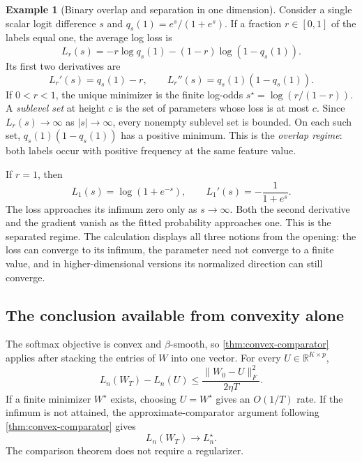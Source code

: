 \documentclass[11pt,twoside]{article}
\newcommand{\R}{\mathbb R}
\theoremstyle{definition}
\newtheorem{example}[theorem]{Example}
\theoremstyle{remark}
\begin{document}
\begin{example}[Binary overlap and separation in one dimension]
\label{ex:binary-softmax-regimes}
Consider a single scalar logit difference $s$ and
$q_s(1)=e^s/(1+e^s)$. If a fraction $r\in[0,1]$ of the labels equal one, the
average log loss is
\begin{equation}
 L_r(s)=-r\log q_s(1)-(1-r)\log(1-q_s(1)).
 \label{eq:binary-intercept-loss}
\end{equation}
Its first two derivatives are
\begin{equation}
 L_r'(s)=q_s(1)-r,
 \qquad
 L_r''(s)=q_s(1)(1-q_s(1)).
 \label{eq:binary-intercept-derivatives}
\end{equation}
If $0<r<1$, the unique minimizer is the finite log-odds
$s^\star=\log(r/(1-r))$. A \emph{sublevel set} at height $c$ is the set of
parameters whose loss is at most $c$. Since $L_r(s)\to\infty$ as
$|s|\to\infty$, every nonempty sublevel set is bounded. On each such set,
$q_s(1)(1-q_s(1))$ has a positive minimum. This is the \emph{overlap regime}:
both
labels occur with positive frequency at the same feature value.

If $r=1$, then
\[
 L_1(s)=\log(1+e^{-s}),
 \qquad
 L_1'(s)=-\frac1{1+e^s}.
\]
The loss approaches its infimum zero only as $s\to\infty$. Both the second
derivative and the gradient vanish as the fitted probability approaches one.
This is the separated regime. The calculation displays all three notions from
the opening: the loss can converge to its infimum, the parameter need not
converge to a finite value, and in higher-dimensional versions its normalized
direction can still converge.
\end{example}

\subsection{The conclusion available from convexity alone}
\label{sec:softmax-comparator}

The softmax objective is convex and $\beta$-smooth, so
\cref{thm:convex-comparator} applies after stacking the entries of $W$ into
one vector. For every $U\in\R^{K\times p}$,
\begin{equation}
 L_n(W_T)-L_n(U)
 \le\frac{\|W_0-U\|_F^2}{2\eta T}.
 \label{eq:softmax-comparator}
\end{equation}
If a finite minimizer $W^\star$ exists, choosing $U=W^\star$ gives an
$O(1/T)$ rate. If the infimum is not attained, the approximate-comparator
argument following \cref{thm:convex-comparator} gives
\begin{equation}
 L_n(W_T)\longrightarrow L_n^\star.
 \label{eq:softmax-general-convergence}
\end{equation}
The comparison theorem does not require a regularizer.
\end{document}
